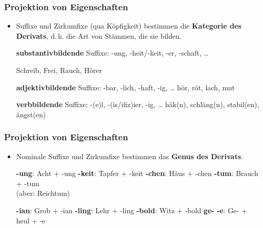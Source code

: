 \begin{frame}
\frametitle{Projektion von Eigenschaften}

\begin{itemize}
\item Suffixe und Zirkumfixe (qua Köpfigkeit) bestimmen die \textbf{Kategorie des Derivats}, d.\,h. die Art von Stämmen, die sie bilden.

\ea 
\ea \textbf{substantivbildende} Suffixe: -ung, -heit/-keit, -er, -schaft, \dots

\ex Schreib, Frei, Rauch, Hörer
\z 
\z

\ea 
\ea \textbf{adjektivbildende} Suffixe: -bar, -lich, -haft, -ig, \dots 
\ex hör, röt, lach, mut
\z 
\z

\ea 
\ea \textbf{verbbildende} Suffixe: -(e)l, -(is/ifiz)ier, -ig, \dots
\ex häk(n), schläng(n), stabil(en), ängst(en)
\z 
\z

\end{itemize}
\end{frame}


\begin{frame}
\frametitle{Projektion von Eigenschaften}

\begin{itemize}

\item Nominale Suffixe und Zirkumfixe bestimmen das \textbf{Genus des Derivats}.

\begin{multicols}{2}

\begin{exe}
\ex \textbf{-ung}:  Acht $+$ -ung
\ex \textbf{-keit}: Tapfer $+$ -keit
\ex \textbf{-chen}: Häus $+$ -chen
\ex \textbf{-tum}: Brauch $+$ -tum\\
(aber: Reichtum)
\end{exe}

\columnbreak

\begin{exe}
\ex \textbf{-ian}: Grob $+$ -ian
\ex \textbf{-ling}: Lehr $+$ -ling
\ex \textbf{-bold}: Witz $+$ -bold
\ex \textbf{ge- -e}: Ge- $+$ heul $+$ -e

~ %
\end{exe}

\end{multicols}

\end{itemize}

\end{frame}


